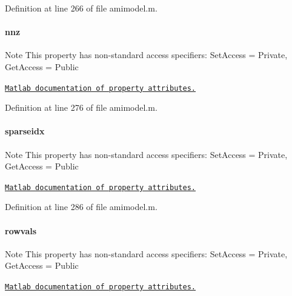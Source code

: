Definition at line 266 of file amimodel.\+m.

\hypertarget{classamimodel_a825ec588729c090ff51ea3473dcbc6b9}{}
\paragraph[{nnz}]{\setlength{\rightskip}{0pt plus 5cm}nnz}\label{classamimodel_a825ec588729c090ff51ea3473dcbc6b9}
\begin{DoxyNote}{Note}
This property has non-\/standard access specifiers\+: {\ttfamily Set\+Access = Private, Get\+Access = Public} 

\href{http://www.mathworks.com/help/matlab/matlab_oop/property-attributes.html}{\tt Matlab documentation of property attributes.} 
\end{DoxyNote}


Definition at line 276 of file amimodel.\+m.

\hypertarget{classamimodel_a6ffb112eda9ff756e17104210981b30b}{}
\paragraph[{sparseidx}]{\setlength{\rightskip}{0pt plus 5cm}sparseidx}\label{classamimodel_a6ffb112eda9ff756e17104210981b30b}
\begin{DoxyNote}{Note}
This property has non-\/standard access specifiers\+: {\ttfamily Set\+Access = Private, Get\+Access = Public} 

\href{http://www.mathworks.com/help/matlab/matlab_oop/property-attributes.html}{\tt Matlab documentation of property attributes.} 
\end{DoxyNote}


Definition at line 286 of file amimodel.\+m.

\hypertarget{classamimodel_aa0abea3560da3f409a28567f42d52872}{}
\paragraph[{rowvals}]{\setlength{\rightskip}{0pt plus 5cm}rowvals}\label{classamimodel_aa0abea3560da3f409a28567f42d52872}
\begin{DoxyNote}{Note}
This property has non-\/standard access specifiers\+: {\ttfamily Set\+Access = Private, Get\+Access = Public} 

\href{http://www.mathworks.com/help/matlab/matlab_oop/property-attributes.html}{\tt Matlab documentation of property attributes.} 
\end{DoxyNote}


